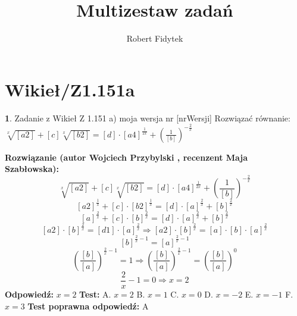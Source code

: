 \documentclass[12pt, a4paper]{article}
\title{Multizestaw zadań}
\author{Robert Fidytek}
\date{}
\theoremstyle{definition} %
\newtheorem{zad}{}
\newcommand{\kategoria}[1]{\section{#1}} %
\newcommand{\zadStart}[1]{\begin{zad}#1\newline} %
\newcommand{\zadStop}{\end{zad}}   %
\newcommand{\rozwStart}[2]{\noindent \textbf{Rozwiązanie (autor #1 , recenzent #2): }\newline} %
\newcommand{\rozwStop}{\newline}                                            %
\newcommand{\odpStart}{\noindent \textbf{Odpowiedź:}\newline}    %
\newcommand{\odpStop}{\newline}                                             %
\newcommand{\testStart}{\noindent \textbf{Test:}\newline} %
\newcommand{\testStop}{\newline} %
\newcommand{\kluczStart}{\noindent \textbf{Test poprawna odpowiedź:}\newline} %
\newcommand{\kluczStop}{\newline} %
\begin{document}
\maketitle


\kategoria{Wikieł/Z1.151a}
\zadStart{Zadanie z Wikieł Z 1.151 a) moja wersja nr [nrWersji]}
Rozwiązać równanie: $\sqrt[x]{[a2]}+[c]\sqrt[x]{[b2]}=[d]\cdot[a4]^{\frac{1}{2x}}+\left(\frac{1}{[b]}\right)^{-\frac{2}{x}}$
\zadStop
\rozwStart{Wojciech Przybylski}{Maja Szabłowska}
$$\sqrt[x]{[a2]}+[c]\sqrt[x]{[b2]}=[d]\cdot[a4]^{\frac{1}{2x}}+\left(\frac{1}{[b]}\right)^{-\frac{2}{x}}$$
$${[a2]}^{\frac{1}{x}}+[c]\cdot{[b2]}^{\frac{1}{x}}=[d]\cdot[a]^{\frac{2}{x}}+[b]^{\frac{2}{x}}$$
$$[a]^{\frac{2}{x}}+[c]\cdot{[b]}^{\frac{2}{x}}=[d]\cdot[a]^{\frac{2}{x}}+[b]^{\frac{2}{x}}$$
$$[a2]\cdot{[b]}^{\frac{2}{x}}=[d1]\cdot[a]^{\frac{2}{x}}\Rightarrow[a2]\cdot{[b]}^{\frac{2}{x}}=[a]\cdot[b]\cdot[a]^{\frac{2}{x}}$$
$$[b]^{\frac{2}{x}-1}=[a]^{\frac{2}{x}-1}$$
$$\left(\frac{[b]}{[a]}\right)^{\frac{2}{x}-1}=1 \Rightarrow \left(\frac{[b]}{[a]}\right)^{\frac{2}{x}-1}=\left(\frac{[b]}{[a]}\right)^{0}$$
$$\frac{2}{x}-1=0 \Rightarrow x=2$$
\rozwStop
\odpStart
$x=2$
\odpStop
\testStart
A. $x=2$
B. $x=1$
C. $x=0$
D. $x=-2$
E. $x=-1$
F. $x=3$
\testStop
\kluczStart
A
\kluczStop
\end{document}
